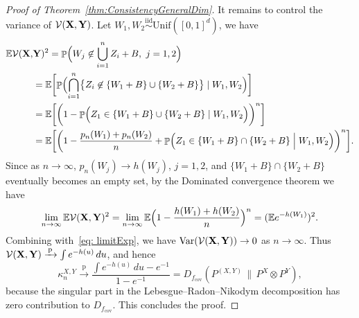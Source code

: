 \documentclass[11pt]{article}
\DeclareMathOperator{\Prob}{\mathbb{P}}
\newcommand{\E}{\mathbb{E}}
\newcommand{\pto}{\xrightarrow{\,\mathrm{p}\,} }
\begin{document}
\begin{proof}[Proof of Theorem~\ref{thm:ConsistencyGeneralDim}]
It remains to control the variance of $\mathcal{V}({\bf X}, {\bf Y})$. Let $W_1, W_2 \stackrel{\mathrm{iid}}{\sim}\mathrm{Unif}([0, 1]^d)$, we have 
\begin{align}
    \E \mathcal{V}({\bf X},& {\bf Y})^2 = \Prob\Bigl(W_j \not\in \bigcup_{i = 1}^n Z_i +B, \ j = 1, 2\Bigr) \notag \\
    & =\E\biggl[\Prob\Bigl(\bigcap_{i = 1}^n\bigl\{Z_i \not \in \{W_1 + B\} \cup \{W_2 + B\}\bigr\} \mid W_1, W_2\Bigr)\biggr] \notag \\ 
    & = \E \biggl[\biggl(1 - \Prob\Bigl(Z_1 \in \{W_1 + B\} \cup \{W_2 + B\} \mid W_1, W_2\Bigr) \biggr)^n\biggr] \notag \\ 
    & = \E \biggl[\biggl(1 - \frac{p_n(W_1) + p_n(W_2)}{n} + \Prob\Bigl(Z_1 \in \{W_1 + B\} \cap \{W_2 + B\} \Bigm| W_1, W_2\Bigr) \biggr)^n\biggr]. \label{eq:VacancySecondMoment}
\end{align}
Since as $n \to \infty$, $p_n(W_j) \to h(W_j)$, $j = 1, 2$, and $\{W_1 + B\} \cap \{W_2 + B\}$ eventually becomes an empty set, by the Dominated convergence theorem we have 
\begin{align*}
    \lim_{n \to \infty}\E \mathcal{V}({\bf X}, {\bf Y})^2 = \lim_{n \to \infty} \E \Bigl(1 - \frac{h(W_1)+h(W_2)}{n}\Bigr)^n = (\E e^{-h(W_1)})^2.
\end{align*}
Combining with~\eqref{eq: limitExp}, we have $\mathrm{Var}(\mathcal{V}({\bf X}, {\bf Y})) \to 0$ as $n \to \infty$. Thus $\mathcal{V}({\bf X},{\bf Y})\pto \int e^{-h(u)}\,du$, and hence
\[
\kappa_n^{X,Y}\pto \frac{\int e^{-h(u)}\,du-e^{-1}}{1-e^{-1}}
=D_{f_{\mathrm{cov}}}(P^{(X,Y)}\,\|\,P^X\otimes P^Y),
\]
because the singular part in the Lebesgue--Radon--Nikodym decomposition has zero contribution to $D_{f_{\mathrm{cov}}}$. This concludes the proof. 
\end{proof}
\end{document}
